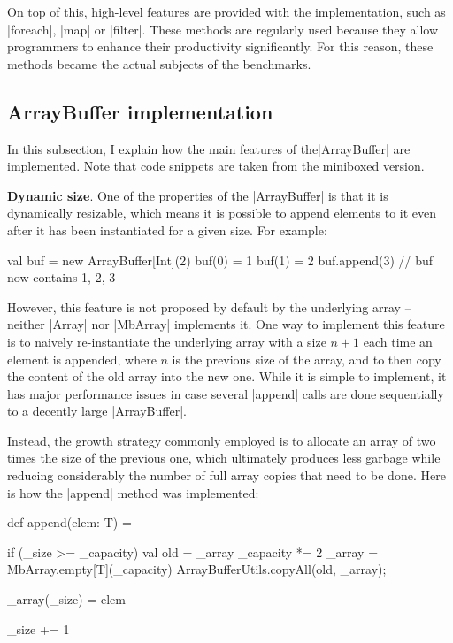 On top of this, high-level features are provided with the implementation, such as |foreach|, |map| or |filter|. These methods are regularly used because they allow programmers to enhance their productivity significantly. For this reason, these methods became the actual subjects of the benchmarks.

\subsection{ArrayBuffer implementation}

In this subsection, I explain how the main features of the\linebreak |ArrayBuffer| are implemented. Note that code snippets are taken from the miniboxed version.

\textbf{Dynamic size}. One of the properties of the |ArrayBuffer| is that it is dynamically resizable, which means it is possible to append elements to it even after it has been instantiated for a given size. For example: 

\begin{lstlisting-nobreak}
val buf = new ArrayBuffer[Int](2)
buf(0) = 1
buf(1) = 2
buf.append(3) // buf now contains {1, 2, 3}
\end{lstlisting-nobreak}

However, this feature is not proposed by default by the underlying array -- neither |Array| nor |MbArray| implements it. One way to implement this feature is to naively re-instantiate the underlying array with a size $n + 1$ each time an element is appended, where $n$ is the previous size of the array, and to then copy the content of the old array into the new one.
While it is simple to implement, it has major performance issues in case several |append| calls are done sequentially to a decently large |ArrayBuffer|.

Instead, the growth strategy commonly employed is to allocate an array of two times the size of the previous one, which ultimately produces less garbage while reducing considerably the number of full array copies that need to be done. Here is how the |append| method was implemented:

\begin{lstlisting-nobreak}
def append(elem: T) = {
  if (_size >= _capacity) {
    val old = _array
    _capacity *= 2
    _array = MbArray.empty[T](_capacity)
    ArrayBufferUtils.copyAll(old, _array);
  }

  _array(_size) = elem

  _size += 1
}
\end{lstlisting-nobreak}

